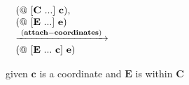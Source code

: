 \begin{flushleft}

$\begin{array}{l}
\begin{array}{l}
  (@~[\mathbf{C}~...]~\mathbf{c}),\\
  (@~[\mathbf{E}~...]~\mathbf{e})\\
  \xrightarrow{\hspace*{0.1cm}\mathbf{(attach-coordinates)}\hspace*{0.1cm}}\\
  (@~[\mathbf{E}~...~\mathbf{c}]~\mathbf{e})\\

  
\end{array}\\[0.1cm]

\end{array}$

\end{flushleft}
given $\mathbf{c}$ is a coordinate and $\mathbf{E }$ is within $\mathbf{C}$
